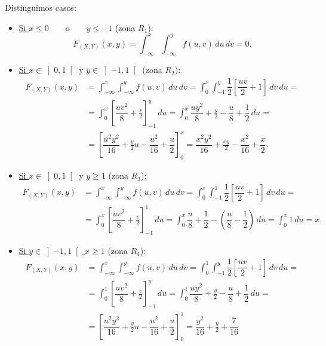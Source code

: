 \begin{ejercicio}
\begin{enumerate}
        Distinguimos casos:
        \begin{itemize}
            \item \ul{Si $x\leq 0 \qquad \text{o} \qquad y\leq -1$} (zona $R_1$):
            \begin{equation*}
                F_{(X,Y)}(x, y) = \int_{-\infty}^x \int_{-\infty}^y
                f(u, v) \, du \, dv = 0.
            \end{equation*}

            \item \ul{Si $x\in \left]0,1\right[ \text{ y } y\in \left]-1,1\right[$} (zona $R_2$):
            \begin{align*}
                F_{(X,Y)}(x, y) &= \int_{-\infty}^x \int_{-\infty}^y
                f(u, v) \, du \, dv = \int_{0}^x \int_{-1}^y
                \dfrac{1}{2}\left[\dfrac{uv}{2}+1\right] \, dv \, du =\\&= \int_{0}^x \left[\dfrac{uv^2}{8}+\frac{v}{2}\right]_{-1}^y \, du =
                \int_{0}^x \dfrac{uy^2}{8}+\frac{y}{2}-\dfrac{u}{8}+\dfrac{1}{2} \, du =\\&= \left[\dfrac{u^2y^2}{16}+\frac{y}{2}u-\dfrac{u^2}{16}+\dfrac{u}{2}\right]_0^x = \dfrac{x^2y^2}{16}+\frac{xy}{2}-\dfrac{x^2}{16}+\dfrac{x}{2}.
            \end{align*}

            \item \ul{Si $x\in \left]0,1\right[ \text{ y } y\geq 1$} (zona $R_3$):
            \begin{align*}
                F_{(X,Y)}(x, y) &= \int_{-\infty}^x \int_{-\infty}^y
                f(u, v) \, du \, dv = \int_{0}^x \int_{-1}^1
                \dfrac{1}{2}\left[\dfrac{uv}{2}+1\right] \, dv \, du =\\&= \int_{0}^x \left[\dfrac{uv^2}{8}+\frac{v}{2}\right]_{-1}^1 \, du =
                \int_{0}^x \dfrac{u}{8}+\dfrac{1}{2} - \left(\dfrac{u}{8}-\dfrac{1}{2}\right) \, du = \int_{0}^x 1 \, du = x.
            \end{align*}

            \item \ul{Si $y\in \left]-1,1\right[$  $x\geq 1$} (zona $R_4$):
            \begin{align*}
                F_{(X,Y)}(x, y) &= \int_{-\infty}^x \int_{-\infty}^y
                f(u, v) \, du \, dv = \int_{0}^1 \int_{-1}^y
                \dfrac{1}{2}\left[\dfrac{uv}{2}+1\right] \, dv \, du =\\&=
                \int_{0}^1 \left[\dfrac{uv^2}{8}+\frac{v}{2}\right]_{-1}^y \, du =
                \int_{0}^1 \dfrac{uy^2}{8}+\frac{y}{2}-\dfrac{u}{8}+\dfrac{1}{2} \, du =\\&=
                \left[\dfrac{u^2y^2}{16}+\frac{y}{2}u-\dfrac{u^2}{16}+\dfrac{u}{2}\right]_0^1 = \dfrac{y^2}{16}+\frac{y}{2}+\dfrac{7}{16}
            \end{align*}


\end{itemize}
\end{enumerate}
\end{ejercicio}
